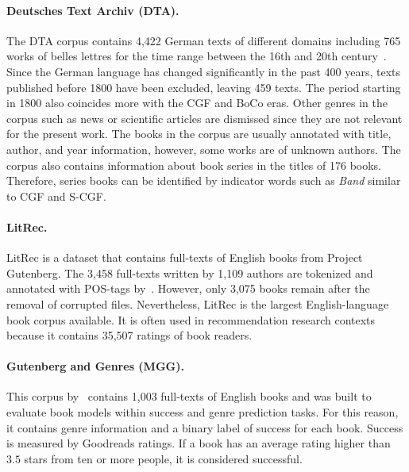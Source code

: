 \documentclass[11pt]{article}
\begin{document}
\paragraph{Deutsches Text Archiv (DTA).}
The DTA corpus contains 4,422 German texts of different domains including 765 works of belles lettres for the time range between the 16th and 20th century~\citep{berlin-brandenburgischen_akademie_der_wissenschaften_deutsches_2021}.
Since the German language has changed significantly in the past 400 years, texts published before 1800 have been excluded, leaving 459 texts.
The period starting in 1800 also coincides more with the CGF and BoCo eras.
Other genres in the corpus such as news or scientific articles are dismissed since they are not relevant for the present work.
The books in the corpus are usually annotated with title, author, and year information, however, some works are of unknown authors.
The corpus also contains information about book series in the titles of 176 books.
Therefore, series books can be identified by indicator words such as \textit{Band} similar to CGF and S-CGF.

\paragraph{LitRec.}
LitRec is a dataset that contains full-texts of English books from Project Gutenberg.
The 3,458 full-texts written by 1,109 authors are tokenized and annotated with POS-tags by~\citet{vaz_litrec_2012}.
However, only 3,075 books remain after the removal of corrupted files.
Nevertheless, LitRec is the largest English-language book corpus available.
It is often used in recommendation research contexts because it contains 35,507 ratings of book readers.

\paragraph{Gutenberg and Genres (MGG).}
This corpus by~\citet{maharjan_multi-task_2017} contains 1,003 full-texts of English books and was built to evaluate book models within success and genre prediction tasks. 
For this reason, it contains genre information and a binary label of success for each book.
Success is measured by Goodreads ratings. 
If a book has an average rating higher than $3.5$ stars from ten or more people, it is considered successful.
\end{document}
